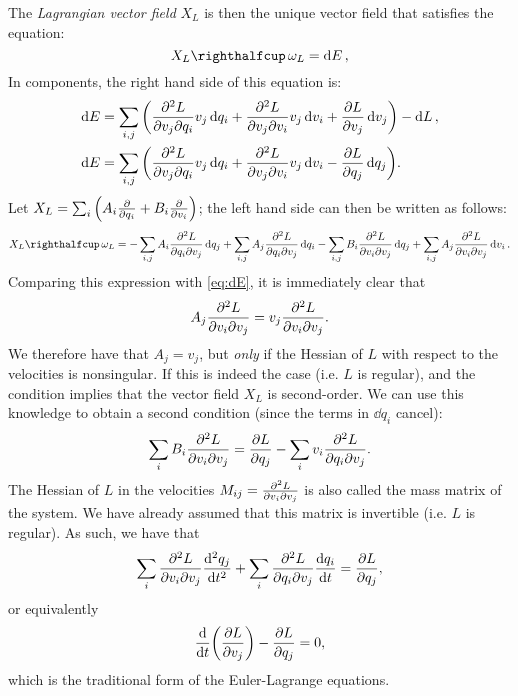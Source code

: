 The \emph{Lagrangian vector field} $X_L$ is then the unique vector field that satisfies the equation: \cite{Godbillon1969}
\begin{equation}
    \intpr{X_L}{\omega_L} = \dd{E},
    \label{eq:EL_nocomp}
\end{equation}
In components, the right hand side of this equation is:
\begin{equation}
    \begin{split}
        \dd{E} &= \sum_{i, j}\qty(\pdv[2]{L}{v_j}{q_i}v_j\dd{q_i} + \pdv[2]{L}{v_j}{v_i}v_j\dd{v_i} + \pdv{L}{v_j}\dd{v_j}) - \dd{L}, \\
        \dd{E} &= \sum_{i, j}\qty(\pdv[2]{L}{v_j}{q_i}v_j\dd{q_i} + \pdv[2]{L}{v_j}{v_i}v_j\dd{v_i} - \pdv{L}{q_j}\dd{q_j}).
    \end{split}
    \label{eq:dE}
\end{equation}
Let $X_L = \sum_i \qty( A_i \pdv{}{q_i} + B_i\pdv{}{v_i}) $; the left hand side can then be written as follows:
\begin{equation}
    \intpr{X_L}{\omega_L} =  - \sum_{i,j} A_i \pdv[2]{L}{q_i}{v_j}\dd{q_j} 
                             + \sum_{i,j} A_j \pdv[2]{L}{q_i}{v_j}\dd{q_i} 
                             - \sum_{i, j} B_i \pdv[2]{L}{v_i}{v_j}\dd{q_j}
                             + \sum_{i, j} A_j \pdv[2]{L}{v_i}{v_j}\dd{v_i}.
\end{equation}
Comparing this expression with \cref{eq:dE}, it is immediately clear that
$$ A_j \pdv[2]{L}{v_i}{v_j} = v_j \pdv[2]{L}{v_i}{v_j}.$$
We therefore have that $A_j = v_j$, but \emph{only} if the Hessian of $L$ with respect to the velocities is nonsingular. If this is indeed the case (i.e. $L$ is regular), and the condition implies that the vector field $X_L$ is second-order. We can use this knowledge to obtain a second condition (since the terms in $\dd{q_i}$ cancel): 
$$
    \sum_{i} B_i \pdv[2]{L}{v_i}{v_j} = \pdv{L}{q_j} - \sum_{i} v_i \pdv[2]{L}{q_i}{v_j}.  
$$
The Hessian of $L$ in the velocities $M_{ij} = \pdv[2]{L}{v_i}{v_j}$ is also called the mass matrix of the system. We have already assumed that this matrix is invertible (i.e. $L$ is regular). As such, we have that
$$ \sum_{i}\pdv[2]{L}{v_i}{v_j}\dv[2]{q_j}{t} + \sum_{i} \pdv[2]{L}{q_i}{v_j}\dv{q_i}{t} = \pdv{L}{q_j}, $$
or equivalently
$$ \dv{}{t}\qty(\pdv{L}{v_j}) - \pdv{L}{q_j} = 0, $$
which is the traditional form of the Euler-Lagrange equations.

